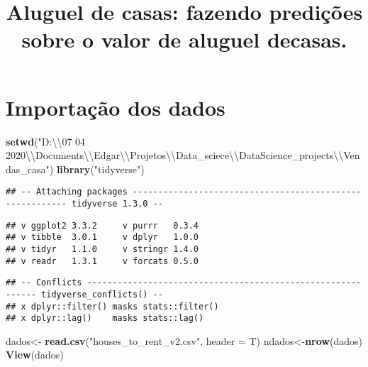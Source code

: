 \documentclass[
]{article}
\title{Aluguel de casas: fazendo predições sobre o valor de aluguel
decasas.}
\author{}
\date{\vspace{-2.5em}}
\newenvironment{Shaded}{\begin{snugshade}}{\end{snugshade}}
\newcommand{\CharTok}[1]{\textcolor[rgb]{0.31,0.60,0.02}{#1}}
\newcommand{\DataTypeTok}[1]{\textcolor[rgb]{0.13,0.29,0.53}{#1}}
\newcommand{\KeywordTok}[1]{\textcolor[rgb]{0.13,0.29,0.53}{\textbf{#1}}}
\newcommand{\NormalTok}[1]{#1}
\newcommand{\StringTok}[1]{\textcolor[rgb]{0.31,0.60,0.02}{#1}}
\begin{document}
\maketitle

\hypertarget{importauxe7uxe3o-dos-dados}{%
\section{Importação dos dados}\label{importauxe7uxe3o-dos-dados}}

\begin{Shaded}
\begin{Highlighting}[]
\KeywordTok{setwd}\NormalTok{(}\StringTok{"D:}\CharTok{\textbackslash{}\textbackslash{}}\StringTok{07 04 2020}\CharTok{\textbackslash{}\textbackslash{}}\StringTok{Documents}\CharTok{\textbackslash{}\textbackslash{}}\StringTok{Edgar}\CharTok{\textbackslash{}\textbackslash{}}\StringTok{Projetos}\CharTok{\textbackslash{}\textbackslash{}}\StringTok{Data\_sciece}\CharTok{\textbackslash{}\textbackslash{}}\StringTok{DataScience\_projects}\CharTok{\textbackslash{}\textbackslash{}}\StringTok{Vendas\_casa"}\NormalTok{)}
\KeywordTok{library}\NormalTok{(}\StringTok{"tidyverse"}\NormalTok{)}
\end{Highlighting}
\end{Shaded}

\begin{verbatim}
## -- Attaching packages --------------------------------------------------------- tidyverse 1.3.0 --
\end{verbatim}

\begin{verbatim}
## v ggplot2 3.3.2     v purrr   0.3.4
## v tibble  3.0.1     v dplyr   1.0.0
## v tidyr   1.1.0     v stringr 1.4.0
## v readr   1.3.1     v forcats 0.5.0
\end{verbatim}

\begin{verbatim}
## -- Conflicts ------------------------------------------------------------ tidyverse_conflicts() --
## x dplyr::filter() masks stats::filter()
## x dplyr::lag()    masks stats::lag()
\end{verbatim}

\begin{Shaded}
\begin{Highlighting}[]
\NormalTok{dados\textless{}{-}}\StringTok{ }\KeywordTok{read.csv}\NormalTok{(}\StringTok{"houses\_to\_rent\_v2.csv"}\NormalTok{, }\DataTypeTok{header =}\NormalTok{ T)}
\NormalTok{ndados\textless{}{-}}\KeywordTok{nrow}\NormalTok{(dados) }
\KeywordTok{View}\NormalTok{(dados)}
\end{Highlighting}
\end{Shaded}
\end{document}
